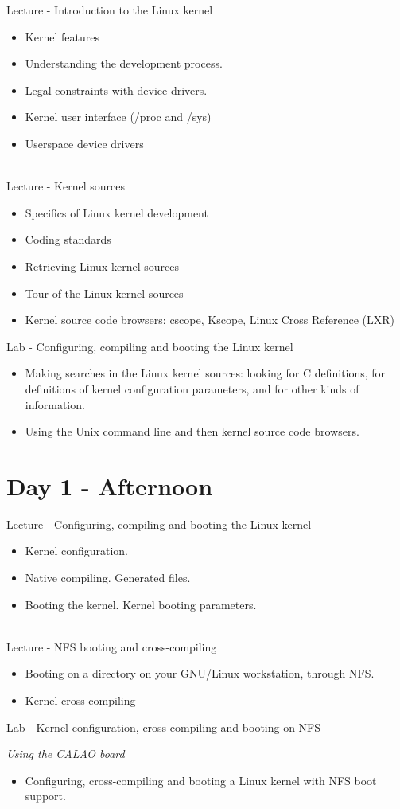 \documentclass[a4paper,12pt,obeyspaces,spaces,hyphens]{article}
\begin{document}
\feagendaonecolumn
{Lecture - Introduction to the Linux kernel}
{
  \begin{itemize}
  \item Kernel features
  \item Understanding the development process.
  \item Legal constraints with device drivers.
  \item Kernel user interface (/proc and /sys)
  \item Userspace device drivers
  \end{itemize}
}
\\
\feagendatwocolumn
{Lecture - Kernel sources}
{
  \begin{itemize}
  \item Specifics of Linux kernel development
  \item Coding standards
  \item Retrieving Linux kernel sources
  \item Tour of the Linux kernel sources
  \item Kernel source code browsers: cscope, Kscope, Linux Cross
    Reference (LXR)
  \end{itemize}
}
{Lab - Configuring, compiling and booting the Linux kernel}
{
  \begin{itemize}
  \item Making searches in the Linux kernel sources: looking for C
    definitions, for definitions of kernel configuration parameters,
    and for other kinds of information.
  \item Using the Unix command line and then kernel source code
    browsers.
 \end{itemize}
}

\section{Day 1 - Afternoon}
\feagendaonecolumn
{Lecture - Configuring, compiling and booting the Linux kernel}
{
  \begin{itemize}
  \item Kernel configuration.
  \item Native compiling. Generated files.
  \item Booting the kernel. Kernel booting parameters.
  \end{itemize}
}
\\
\feagendatwocolumn
{Lecture - NFS booting and cross-compiling}
{
  \begin{itemize}
  \item Booting on a directory on your GNU/Linux workstation, through
    NFS.
  \item Kernel cross-compiling
  \end{itemize}
}
{Lab - Kernel configuration, cross-compiling and booting on NFS}
{
  {\em Using the CALAO board}
  \begin{itemize}
  \item Configuring, cross-compiling and booting a Linux kernel with
    NFS boot support.
  \end{itemize}
}
\\
\end{document}

